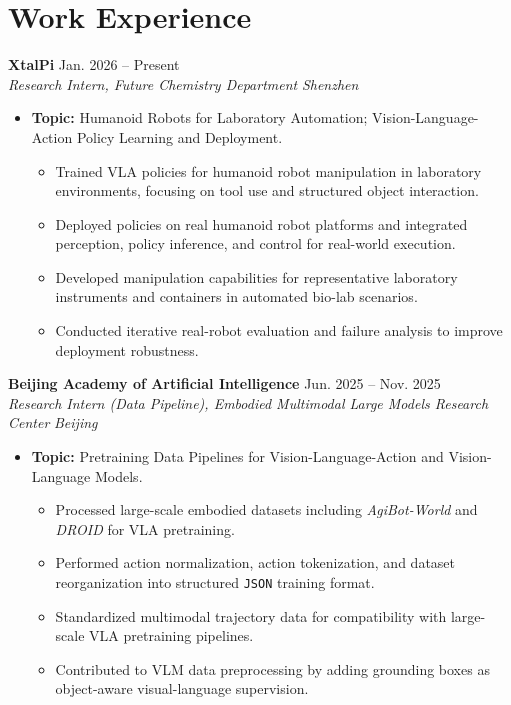 \documentclass[10pt,a4paper]{article}
\newcommand{\entry}[4]{%
  \textbf{#1} \hfill #2\\
  \textit{#3} \hfill \textit{#4}\\[-0.35em]
}
\newcommand{\cvitem}[1]{\item \small #1}
\begin{document}
\section*{Work Experience}
\entry{XtalPi}{Jan. 2026 -- Present}{Research Intern, Future Chemistry Department}{Shenzhen}
\begin{itemize}[leftmargin=1.2em, topsep=0.2em, itemsep=0.18em]
  \cvitem{\textbf{Topic:} Humanoid Robots for Laboratory Automation; Vision-Language-Action Policy Learning and Deployment.}
  \begin{itemize}[leftmargin=1.4em, topsep=0.15em, itemsep=0.12em]
    \item Trained VLA policies for humanoid robot manipulation in laboratory environments, focusing on tool use and structured object interaction.
    \item Deployed policies on real humanoid robot platforms and integrated perception, policy inference, and control for real-world execution.
    \item Developed manipulation capabilities for representative laboratory instruments and containers in automated bio-lab scenarios.
    \item Conducted iterative real-robot evaluation and failure analysis to improve deployment robustness.
  \end{itemize}
\end{itemize}

\entry{Beijing Academy of Artificial Intelligence}{Jun. 2025 -- Nov. 2025}{Research Intern (Data Pipeline), Embodied Multimodal Large Models Research Center}{Beijing}
\begin{itemize}[leftmargin=1.2em, topsep=0.2em, itemsep=0.18em]
  \cvitem{\textbf{Topic:} Pretraining Data Pipelines for Vision-Language-Action and Vision-Language Models.}
  \begin{itemize}[leftmargin=1.4em, topsep=0.15em, itemsep=0.12em]
    \item Processed large-scale embodied datasets including \textit{AgiBot-World} and \textit{DROID} for VLA pretraining.
    \item Performed action normalization, action tokenization, and dataset reorganization into structured \texttt{JSON} training format.
    \item Standardized multimodal trajectory data for compatibility with large-scale VLA pretraining pipelines.
    \item Contributed to VLM data preprocessing by adding grounding boxes as object-aware visual-language supervision.
  \end{itemize}
\end{itemize}
\end{document}
